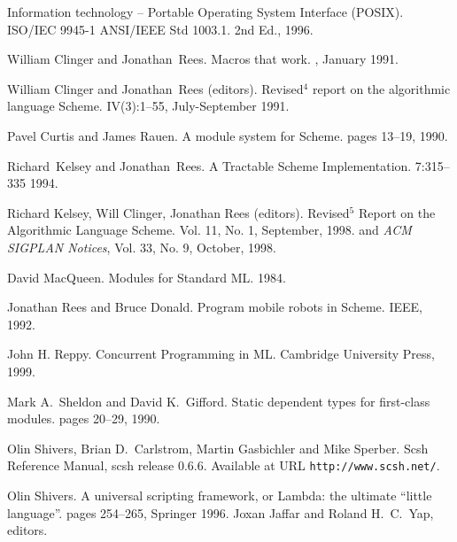 
\begin{thebibliography}{10}
\addtocounter{chapter}{1}
\T{}

Information technology -- Portable Operating System Interface (POSIX).
\newblock ISO/IEC 9945-1 ANSI/IEEE Std 1003.1.
\newblock 2nd Ed., 1996.

William Clinger and Jonathan~Rees.
\newblock Macros that work.
, January 1991.

William Clinger and Jonathan~Rees (editors).
\newblock Revised${}^4$ report on the algorithmic language {S}cheme.
 IV(3):1--55, July-September 1991.

Pavel Curtis and James Rauen.
\newblock A module system for Scheme.
pages 13--19, 1990.

Richard~Kelsey and Jonathan~Rees.
\newblock A Tractable {Scheme} Implementation.
 7:315--335 1994.

Richard Kelsey, Will Clinger, Jonathan Rees (editors).
\newblock Revised$^5$ Report on the Algorithmic Language Scheme.
 Vol. 11, No. 1,
 September, 1998.
\newblock and {\em ACM SIGPLAN Notices}, Vol. 33, No. 9, October, 1998.

David MacQueen.
\newblock Modules for Standard ML.
1984.

Jonathan Rees and Bruce Donald.
\newblock Program mobile robots in Scheme.
 IEEE, 1992. 

John H. Reppy.
\newblock Concurrent Programming in ML.
\newblock Cambridge University Press, 1999.

Mark A.~Sheldon and David K.~Gifford.
\newblock Static dependent types for first-class modules.
pages 20--29, 1990.

Olin Shivers, Brian D.~Carlstrom, Martin Gasbichler and Mike Sperber.
\newblock Scsh Reference Manual, scsh release 0.6.6.
\newblock Available at URL \texttt{http://www.scsh.net/}.

Olin Shivers.
\newblock A universal scripting framework, 
 or Lambda: the ultimate ``little language''.
 pages 254--265, Springer 1996.
\newblock Joxan Jaffar and Roland H.~C.~Yap, editors.

\end{thebibliography}
